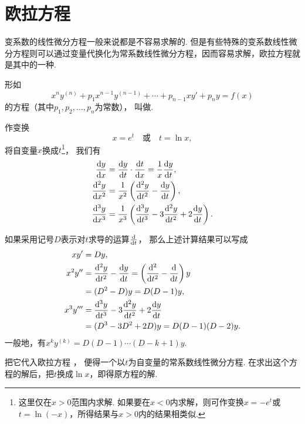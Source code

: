 \section{欧拉方程}
变系数的线性微分方程一般来说都是不容易求解的.
但是有些特殊的变系数线性微分方程则可以通过变量代换化为常系数线性微分方程，因而容易求解，欧拉方程就是其中的一种.

形如\begin{equation}\label{equation:微分方程.欧拉方程的一般形式}
	x^n y^{(n)} + p_1 x^{n-1} y^{(n-1)} + \dotsb + p_{n-1} x y' + p_n y = f(x)
\end{equation}的方程（其中\(p_1,p_2,\dotsc,p_n\)为常数），
叫做.

作变换\[
	x = e^t \quad\text{或}\quad t = \ln x,
\]
将自变量\(x\)换成\(t\)\footnote{这里仅在\(x>0\)范围内求解.
如果要在\(x<0\)内求解，则可作变换\(x=-e^t\)或\(t=\ln(-x)\)，所得结果与\(x>0\)内的结果相类似.}，
我们有\begin{align*}
	\dv{y}{x}
	&= \dv{y}{t} \cdot \dv{t}{x} = \frac{1}{x} \dv{y}{t}, \\
	\dv[2]{y}{x}
	&= \frac{1}{x^2} \left( \dv[2]{y}{t} - \dv{y}{t} \right), \\
	\dv[3]{y}{x}
	&= \frac{1}{x^3} \left( \dv[3]{y}{t} - 3 \dv[2]{y}{t} + 2 \dv{y}{t} \right).
\end{align*}

如果采用记号\(D\)表示对\(t\)求导的运算\(\dv{t}\)，
那么上述计算结果可以写成\begin{align*}
	x y' &= Dy, \\
	x^2 y'' &= \dv[2]{y}{t} - \dv{y}{t}
		= \left(\dv[2]{t} - \dv{t}\right)y \\
		&= (D^2 - D)y = D(D-1)y, \\
	x^3 y''' &= \dv[3]{y}{t} - 3 \dv[2]{y}{t} + 2 \dv{y}{t} \\
		&= (D^3-3D^2+2D)y = D(D-1)(D-2)y.
\end{align*}
一般地，有\(x^k y^{(k)} = D(D-1)\dotsm(D-k+1)y\).

把它代入欧拉方程 ，
便得一个以\(t\)为自变量的常系数线性微分方程.
在求出这个方程的解后，把\(t\)换成\(\ln x\)，即得原方程的解.
